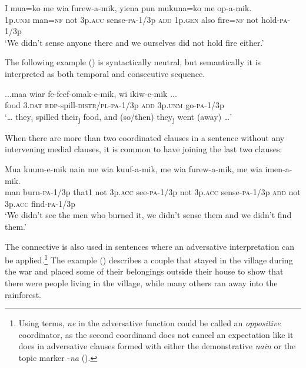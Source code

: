 \ea%
\label{ex:x1372}
\gll I  mua=ko  me  wia  furew-a-mik,    yiena  pun  mukuna=ko  me  op-a-mik.\\
1p.\textsc{unm}  man=\textsc{nf}  not  3p.\textsc{acc}  sense-\textsc{pa}-1/3p  \textsc{add}  1p.\textsc{gen}  also fire=\textsc{nf}  not  hold-\textsc{pa}-1/3p    \\
\glt`We didn't sense anyone there and we ourselves did not hold fire either.'
\z


The following example () is syntactically neutral, but semantically it is interpreted as both temporal and consecutive sequence.

\ea%
\label{ex:x1373}
\gll ...maa  wiar  fe-feef-omak-e-mik,    wi  ikiw-e-mik ...\\
food  3.\textsc{dat} \textsc{rdp}-spill-\textsc{distr}/\textsc{pl}-\textsc{pa}-1/3p  \textsc{add}  3p.\textsc{unm} go-\textsc{pa}-1/3p   \\
\glt`{\dots} they\textsubscript{i} spilled their\textsubscript{j} food, and (so/then) they\textsubscript{j} went (away) {\dots}'
\z


When there are more than two coordinated clauses in a sentence without any intervening medial clauses, it is common to have   joining the last two clauses:

\ea%
\label{ex:x1374}
\gll Mua  kuum-e-mik  nain  me  wia  kuuf-a-mik,  me wia  furew-a-mik,    me  wia  imen-a-mik. \\
man  burn-\textsc{pa}-1/3p  that1  not  3p.\textsc{acc}  see-\textsc{pa}-1/3p  not 3p.\textsc{acc}  sense-\textsc{pa}-1/3p  \textsc{add}  not  3p.\textsc{acc}  find-\textsc{pa}-1/3p     \\
\glt`We didn't see the men who burned it, we didn't sense them and we didn't find them.'
\z


The connective   is also used in sentences where an adversative interpretation can be applied.\footnote{Using  terms, \textit{ne} in the adversative function could be called an \textit{oppositive} coordinator, as the second coordinand does not cancel an expectation like it does in adversative clauses formed with either the demonstrative \textit{nain} or the topic marker -\textit{na} ().}  The example () describes a couple that stayed in the village during the war and placed some of their belongings outside their house to show that there were people living in the village, while many others ran away into the rainforest. 

